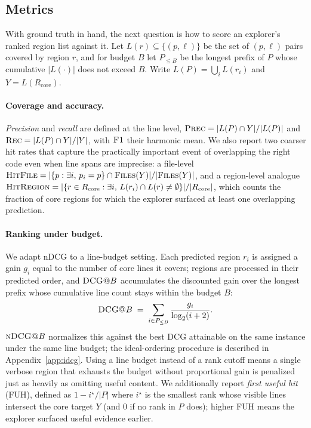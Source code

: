 \documentclass{llmxive}
\begin{document}
 
\subsection{Metrics}
\label{sec:metrics}
 
With ground truth in hand, the next question is how to score an explorer's ranked region list against it. Let $L(r) \subseteq \{(p, \ell)\}$ be the set of $(p, \ell)$ pairs covered by region $r$, and for budget $B$ let $P_{\leq B}$ be the longest prefix of $P$ whose cumulative $|L(\cdot)|$ does not exceed $B$. Write $L(P) = \bigcup_i L(r_i)$ and $Y = L(R_{\text{core}})$.
 
\paragraph{Coverage and accuracy.}

\emph{Precision} and \emph{recall} are defined at the line level,
$\textsc{Prec} = |L(P) \cap Y| / |L(P)|$ and $\textsc{Rec} = |L(P) \cap Y| / |Y|$, with $\textsc{F1}$ their harmonic mean. We also report two coarser hit rates that capture the practically important event of overlapping the right code even when line spans are imprecise: a file-level
$\textsc{HitFile} = |\{p : \exists i,\, p_i = p\} \cap \textsc{Files}(Y)| / |\textsc{Files}(Y)|$,
and a region-level analogue
$\textsc{HitRegion} = |\{r \in R_{\text{core}} : \exists i,\, L(r_i) \cap L(r) \neq \emptyset\}| / |R_{\text{core}}|$,
which counts the fraction of core regions for which the explorer surfaced at least one overlapping prediction.
 
\paragraph{Ranking under budget.}
We adapt nDCG to a line-budget setting. Each predicted region $r_i$ is assigned a gain $g_i$ equal to the number of core lines it covers; regions are processed in their predicted order, and $\textsc{DCG@}B$ accumulates the discounted gain over the longest prefix whose cumulative line count stays within the budget $B$:
\[
  \textsc{DCG@}B \;=\; \sum_{i \in P_{\leq B}} \frac{g_i}{\log_2(i+2)}.
\]
$\textsc{nDCG@}B$ normalizes this against the best DCG attainable on the same instance under the same line budget; the ideal-ordering procedure is described in Appendix~\ref{app:idcg}. Using a line budget instead of a rank cutoff means a single verbose region that exhausts the budget without proportional gain is penalized just as heavily as omitting useful content. We additionally report \emph{first useful hit} (FUH), defined as $1 - i^\star / |P|$ where $i^\star$ is the smallest rank whose visible lines intersect the core target $Y$ (and $0$ if no rank in $P$ does); higher FUH means the explorer surfaced useful evidence earlier.
\end{document}
